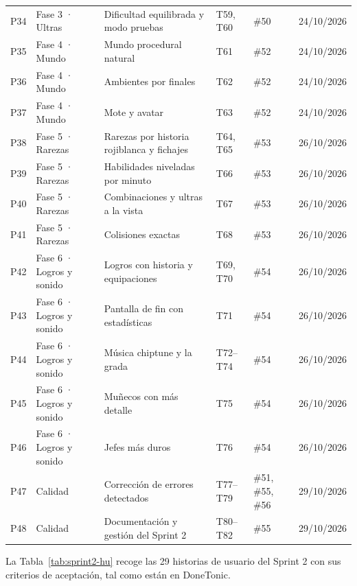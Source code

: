 {\begin{longtable}{@{}L{0.7cm} L{2.0cm} L{4.9cm} L{1.6cm} L{2.0cm} L{2.0cm}@{}}
P34 & Fase 3 · Ultras & Dificultad equilibrada y modo pruebas & T59, T60 & \#50 & 24/10/2026 \\
P35 & Fase 4 · Mundo & Mundo procedural natural & T61 & \#52 & 24/10/2026 \\
P36 & Fase 4 · Mundo & Ambientes por finales & T62 & \#52 & 24/10/2026 \\
P37 & Fase 4 · Mundo & Mote y avatar & T63 & \#52 & 24/10/2026 \\
P38 & Fase 5 · Rarezas & Rarezas por historia rojiblanca y fichajes & T64, T65 & \#53 & 26/10/2026 \\
P39 & Fase 5 · Rarezas & Habilidades niveladas por minuto & T66 & \#53 & 26/10/2026 \\
P40 & Fase 5 · Rarezas & Combinaciones y ultras a la vista & T67 & \#53 & 26/10/2026 \\
P41 & Fase 5 · Rarezas & Colisiones exactas & T68 & \#53 & 26/10/2026 \\
P42 & Fase 6 · Logros y sonido & Logros con historia y equipaciones & T69, T70 & \#54 & 26/10/2026 \\
P43 & Fase 6 · Logros y sonido & Pantalla de fin con estadísticas & T71 & \#54 & 26/10/2026 \\
P44 & Fase 6 · Logros y sonido & Música chiptune y la grada & T72--T74 & \#54 & 26/10/2026 \\
P45 & Fase 6 · Logros y sonido & Muñecos con más detalle & T75 & \#54 & 26/10/2026 \\
P46 & Fase 6 · Logros y sonido & Jefes más duros & T76 & \#54 & 26/10/2026 \\*
P47 & Calidad & Corrección de errores detectados & T77--T79 & \#51, \#55, \#56 & 29/10/2026 \\*
P48 & Calidad & Documentación y gestión del Sprint 2 & T80--T82 & \#55 & 29/10/2026 \\*
\bottomrule
\end{longtable}
}

La Tabla~\ref{tab:sprint2-hu} recoge las 29 historias de usuario del Sprint 2 con sus criterios de aceptación, tal como están en DoneTonic.

